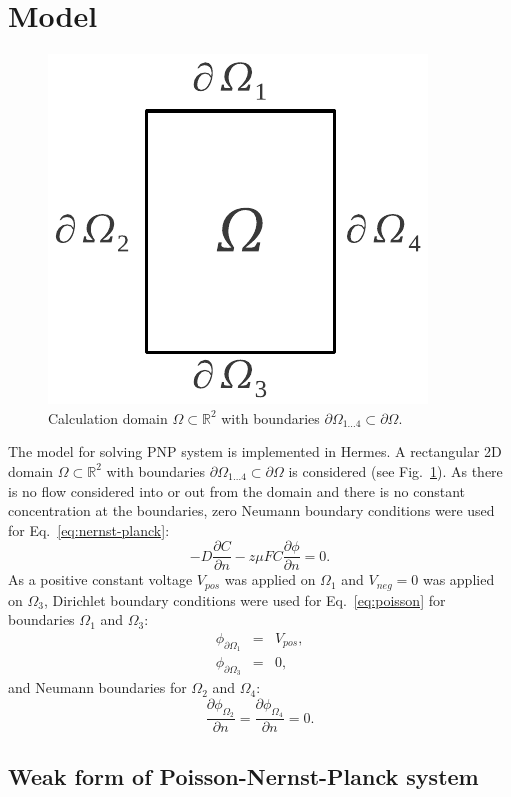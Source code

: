 \section{Model}\label{sec:model}
\label{sec:model}

\begin{figure}
  \begin{centering}
  \includegraphics[width=0.2\columnwidth]{domain}
  \caption{\label{fig:domain} Calculation domain $\Omega\subset\mathbb{R}^2$
  	with boundaries $\partial\Omega_{1\ldots 4}\subset\partial\Omega$.}
  \end{centering}
\end{figure}

The model for solving PNP system is implemented in Hermes.
A rectangular 2D domain $\Omega\subset\mathbb{R}^2$ with boundaries 
$\partial\Omega_{1\ldots 4}\subset\partial\Omega$  is considered (see Fig.~\ref{fig:domain}). 
As there is no flow considered into or out from the domain and there is no
constant concentration at the boundaries, zero Neumann boundary conditions were used 
for Eq.~\eqref{eq:nernst-planck}:
\begin{equation}
  -D \frac{\partial C}{\partial n} - z \mu F C \frac{\partial \phi} {\partial n} = 0.
  \label{eq:nernst-planck-boundary}
\end{equation}
As a positive constant voltage $V_{pos}$ was applied on $\Omega_1$ and $V_{neg}=0$ was applied
on $\Omega_3$, Dirichlet boundary conditions were used for Eq.~\eqref{eq:poisson} for
boundaries $\Omega_1$ and $\Omega_3$:
\begin{eqnarray}
  \phi_{\partial\Omega_1}&=&V_{pos},\\
  \phi_{\partial\Omega_3}&=&0,
  \label{eq:dirichlet}
\end{eqnarray}
and Neumann boundaries for $\Omega_2$ and $\Omega_4$:
\begin{equation}
  \frac{\partial \phi_{\Omega_2}}{\partial n}=\frac{\partial \phi_{\Omega_4}}{\partial n}=0.
\end{equation}


\subsection{Weak form of Poisson-Nernst-Planck system}

